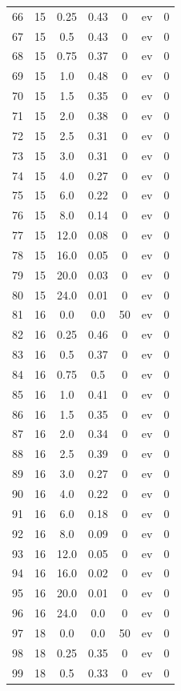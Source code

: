 \documentclass[12pt,a4paper]{article}
\begin{document}
\begin{tabular}{r|cccccc}
	66 & 15 & 0.25 & 0.43 & 0 & ev & 0 \\
	67 & 15 & 0.5 & 0.43 & 0 & ev & 0 \\
	68 & 15 & 0.75 & 0.37 & 0 & ev & 0 \\
	69 & 15 & 1.0 & 0.48 & 0 & ev & 0 \\
	70 & 15 & 1.5 & 0.35 & 0 & ev & 0 \\
	71 & 15 & 2.0 & 0.38 & 0 & ev & 0 \\
	72 & 15 & 2.5 & 0.31 & 0 & ev & 0 \\
	73 & 15 & 3.0 & 0.31 & 0 & ev & 0 \\
	74 & 15 & 4.0 & 0.27 & 0 & ev & 0 \\
	75 & 15 & 6.0 & 0.22 & 0 & ev & 0 \\
	76 & 15 & 8.0 & 0.14 & 0 & ev & 0 \\
	77 & 15 & 12.0 & 0.08 & 0 & ev & 0 \\
	78 & 15 & 16.0 & 0.05 & 0 & ev & 0 \\
	79 & 15 & 20.0 & 0.03 & 0 & ev & 0 \\
	80 & 15 & 24.0 & 0.01 & 0 & ev & 0 \\
	81 & 16 & 0.0 & 0.0 & 50 & ev & 0 \\
	82 & 16 & 0.25 & 0.46 & 0 & ev & 0 \\
	83 & 16 & 0.5 & 0.37 & 0 & ev & 0 \\
	84 & 16 & 0.75 & 0.5 & 0 & ev & 0 \\
	85 & 16 & 1.0 & 0.41 & 0 & ev & 0 \\
	86 & 16 & 1.5 & 0.35 & 0 & ev & 0 \\
	87 & 16 & 2.0 & 0.34 & 0 & ev & 0 \\
	88 & 16 & 2.5 & 0.39 & 0 & ev & 0 \\
	89 & 16 & 3.0 & 0.27 & 0 & ev & 0 \\
	90 & 16 & 4.0 & 0.22 & 0 & ev & 0 \\
	91 & 16 & 6.0 & 0.18 & 0 & ev & 0 \\
	92 & 16 & 8.0 & 0.09 & 0 & ev & 0 \\
	93 & 16 & 12.0 & 0.05 & 0 & ev & 0 \\
	94 & 16 & 16.0 & 0.02 & 0 & ev & 0 \\
	95 & 16 & 20.0 & 0.01 & 0 & ev & 0 \\
	96 & 16 & 24.0 & 0.0 & 0 & ev & 0 \\
	97 & 18 & 0.0 & 0.0 & 50 & ev & 0 \\
	98 & 18 & 0.25 & 0.35 & 0 & ev & 0 \\
	99 & 18 & 0.5 & 0.33 & 0 & ev & 0 \\

\end{tabular}
\end{document}
